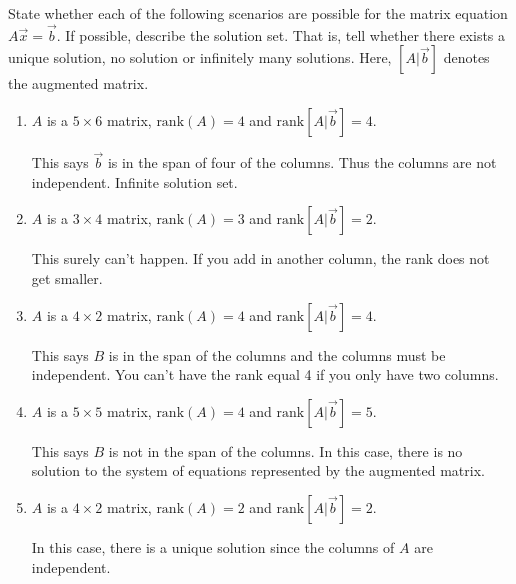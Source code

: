 \documentclass{ximera}
\begin{document}
\begin{problem}\label{prb:2.56} State whether each of the following scenarios are possible for the
matrix equation $A\vec{x}=\vec{b}$. If possible, describe the solution set.
That is, tell whether there exists a unique solution, no solution or
infinitely many solutions. Here, $\left[ A |\vec{b} \right]$ denotes the augmented matrix.

\begin{enumerate}
\item $A$ is a $5\times 6$ matrix, $\mbox{rank}\left( A\right) =4$ and
$\mbox{rank}\left[ A |\vec{b} \right] =4.$
\begin{hint}
This says $\vec{b}$ is in the span of four of the columns. Thus the columns are not independent. Infinite solution set.
\end{hint}

\item $A$ is a $3\times 4$ matrix, $\mbox{rank}\left( A\right) =3$ and
$\mbox{rank}\left[ A |\vec{b} \right] =2.$
\begin{hint}
This surely can't happen. If you add in another column, the rank does not get smaller.
\end{hint}

\item $A$ is a $4\times 2$ matrix, $\mbox{rank}\left( A\right) =4$ and
$\mbox{rank}\left[ A |\vec{b} \right] =4.$
\begin{hint}
This says $B$ is in the span of the columns and the columns must be
independent. You can't have the rank equal 4 if you only have two columns.
\end{hint}

\item $A$ is a $5\times 5$ matrix, $\mbox{rank}\left( A\right) =4$ and
$\mbox{rank}\left[ A |\vec{b} \right] =5.$
\begin{hint}
This says $B$ is not in the span of the columns. In this case, there is no solution to the system of equations represented by the augmented matrix.
\end{hint}

\item $A$ is a $4\times 2$ matrix, $\mbox{rank}\left( A\right) =2$ and
$\mbox{rank}\left[ A |\vec{b} \right] =2$.

\begin{hint}
In this case, there is a
unique solution since the columns of $A$ are independent.
\end{hint}
\end{enumerate}
\end{problem}
\end{document}
